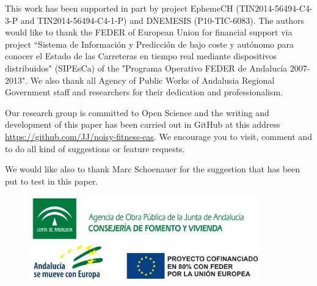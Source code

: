 \documentclass{llncs}
\begin{document}
This work has been supported in part by project EphemeCH
(TIN2014-56494-C4-3-P and TIN2014-56494-C4-1-P) and DNEMESIS (P10-TIC-6083).
The authors would like to thank the FEDER of European Union for
financial support via project ``Sistema de Informaci\'on y Predicci\'on de
bajo coste y aut\'onomo para conocer el Estado de las Carreteras en
tiempo real mediante dispositivos distribuidos" (SIPEsCa) of the
"Programa Operativo FEDER de Andaluc\'ia 2007-2013". We also thank all
Agency of Public Works of Andalusia Regional Government staff and
researchers for their dedication and professionalism.

Our research group is committed to Open Science and the writing and
development of this paper has been carried out in GitHub at this
address \url{https://github.com/JJ/noisy-fitness-eas}. We encourage you
to visit, comment and to do all kind of suggestions or feature
requests.

We would like also to thank Marc Schoenauer for the suggestion that
has been put to test in this paper.


\begin{figure}[!h]
\begin{center}
\includegraphics[width=10cm]{../images/logos_SIPESCA_2.jpg}
\end{center}
\end{figure}


  
\end{document}
